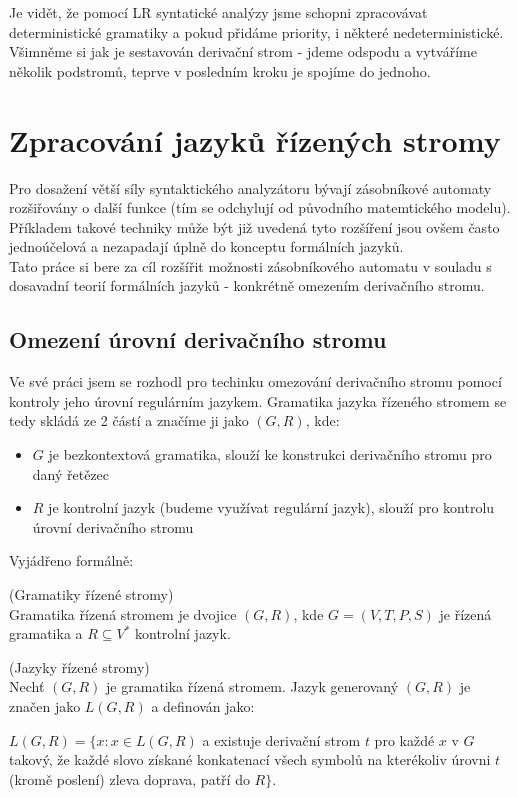 Je vidět, že pomocí LR syntatické analýzy jsme schopni zpracovávat deterministické
gramatiky a pokud přidáme priority, i některé nedeterministické. Všimněme si jak je
sestavován derivační strom - jdeme odspodu a vytváříme několik podstromů,
teprve v posledním kroku je spojíme do jednoho.


\chapter{Zpracování jazyků řízených stromy}
\label{ch:processingTreeLanguages}

Pro dosažení větší síly syntaktického analyzátoru bývají zásobníkové automaty
rozšiřovány o další funkce (tím se odchylují od původního matemtického modelu).
Příkladem takové techniky může být již uvedená 
tyto rozšíření jsou ovšem často jednoúčelová a nezapadají úplně do konceptu
formálních jazyků.\\

Tato práce si bere za cíl rozšířit možnosti zásobníkového automatu v
souladu s dosavadní teorií formálních jazyků - konkrétně omezením derivačního
stromu.\\

\section{Omezení úrovní derivačního stromu}

Ve své práci jsem se rozhodl pro techinku omezování derivačního stromu pomocí
kontroly jeho úrovní regulárním jazykem.
Gramatika jazyka řízeného stromem se tedy skládá ze 2 částí a značíme ji jako
$(G, R)$, kde:
\begin{itemize}
  \item $G$ je bezkontextová gramatika, slouží ke konstrukci derivačního stromu
  pro daný řetězec
  \item $R$ je kontrolní jazyk (budeme využívat regulární jazyk),
  slouží pro kontrolu úrovní derivačního stromu
\end{itemize}

\noindent
Vyjádřeno formálně:

\begin{defn}
  (Gramatiky řízené stromy)\\
  Gramatika řízená stromem je dvojice $(G, R)$, kde $G = (V, T, P, S)$
  je řízená gramatika a $R \subseteq V^*$ kontrolní jazyk.
\end{defn}

\begin{defn}
  \label{defn:treeControlledLanguages}
  (Jazyky řízené stromy)\\
  Nechť $(G, R)$ je gramatika řízená stromem.
  Jazyk generovaný $(G, R)$ je značen jako $L(G, R)$ a definován jako:
  \vspace{5pt}
  \begin{adjustwidth}{0.5cm}{0.5cm}
    $L(G, R) = \{x: x \in L(G, R)$ a existuje derivační strom $t$ pro
    každé $x$ v $G$ takový, že každé slovo získané konkatenací
    všech symbolů na kterékoliv úrovni $t$ (kromě poslení) zleva doprava,
    patří do $R \}$.
  \end{adjustwidth}
\end{defn}

